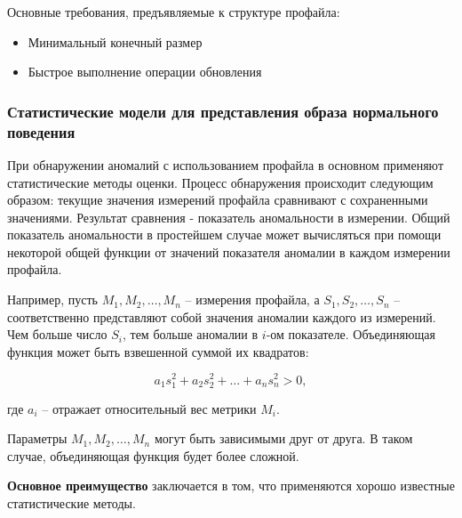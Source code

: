 Основные требования, предъявляемые к структуре профайла:
\begin{itemize}
	\item Минимальный конечный размер

	\item Быстрое выполнение операции обновления
\end{itemize}



\subsubsection{Статистические модели для представления образа нормального поведения}

При обнаружении аномалий с использованием профайла в основном применяют статистические
методы оценки. Процесс обнаружения происходит следующим образом: текущие значения измерений
профайла сравнивают с сохраненными значениями. Результат сравнения - показатель аномальности
в измерении. Общий показатель аномальности в простейшем случае может вычисляться при помощи
некоторой общей функции от значений показателя аномалии в каждом измерении профайла.

Например, пусть $M_1, M_2, \dots, M_n$ -- измерения профайла, а $S_1, S_2, \dots, S_n$ --
соответственно представляют собой значения аномалии каждого из измерений. Чем больше
число $S_i$, тем больше аномалии в $i$-ом показателе. Объединяющая функция может быть
взвешенной суммой их квадратов:

\begin{equation}
	a_1s_1^2 + a_2s_2^2 + \dots + a_ns_n^2 > 0,
\end{equation}

где $a_i$ -- отражает относительный вес метрики $M_i$.

Параметры $M_1, M_2, \dots, M_n$ могут быть зависимыми друг от друга. В таком случае,
объединяющая функция будет более сложной.\autocite{IDSystem}

\textbf{Основное преимущество} заключается в том, что применяются хорошо известные статистические методы.

